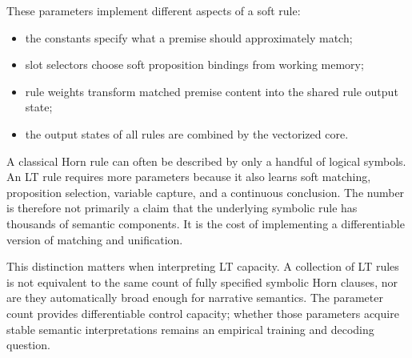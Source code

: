 \documentclass[14pt]{article}
\begin{document}
These parameters implement different aspects of a soft rule:
\begin{itemize}[leftmargin=1.5em]
  \item the constants specify what a premise should approximately match;
  \item slot selectors choose soft proposition bindings from working memory;
  \item rule weights transform matched premise content into the shared rule
        output state;
  \item the output states of all rules are combined by the vectorized core.
\end{itemize}

A classical Horn rule can often be described by only a handful of logical
symbols.  An LT rule requires more parameters because it also learns soft
matching, proposition selection, variable capture, and a continuous conclusion.
The number is therefore not primarily a claim that the underlying symbolic
rule has thousands of semantic components.  It is the cost of implementing a
differentiable version of matching and unification.

This distinction matters when interpreting LT capacity.  A collection of LT
rules is not equivalent to the same count of fully specified symbolic Horn clauses, nor are they
automatically broad enough for narrative semantics.  The parameter count
provides differentiable control capacity; whether those parameters acquire
stable semantic interpretations remains an empirical training and decoding
question.
\end{document}
